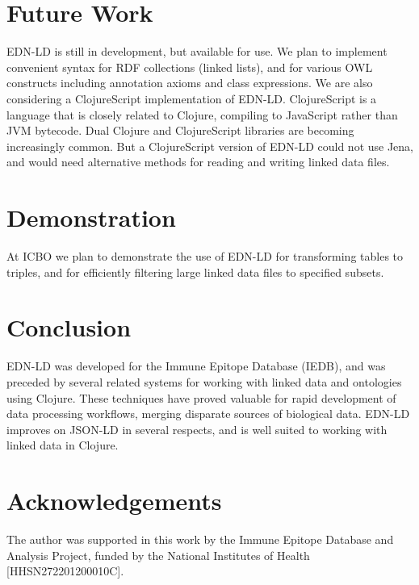 \documentclass{icbo}
\begin{document}
\section{Future Work}

EDN-LD is still in development, but available for use. We plan to implement convenient syntax for RDF collections (linked lists), and for various OWL constructs including annotation axioms and class expressions. We are also considering a ClojureScript implementation of EDN-LD. ClojureScript is a language that is closely related to Clojure, compiling to JavaScript rather than JVM bytecode. Dual Clojure and ClojureScript libraries are becoming increasingly common. But a ClojureScript version of EDN-LD could not use Jena, and would need alternative methods for reading and writing linked data files.


\section{Demonstration}

At ICBO we plan to demonstrate the use of EDN-LD for transforming tables to triples, and for efficiently filtering large linked data files to specified subsets.


\section{Conclusion}

EDN-LD was developed for the Immune Epitope Database (IEDB), and was preceded by several related systems for working with linked data and ontologies using Clojure. These techniques have proved valuable for rapid development of data processing workflows, merging disparate sources of biological data. EDN-LD improves on JSON-LD in several respects, and is well suited to working with linked data in Clojure.


\section*{Acknowledgements}

The author was supported in this work by the Immune Epitope Database and Analysis Project, funded by the National Institutes of Health [HHSN272201200010C].





\end{document}

